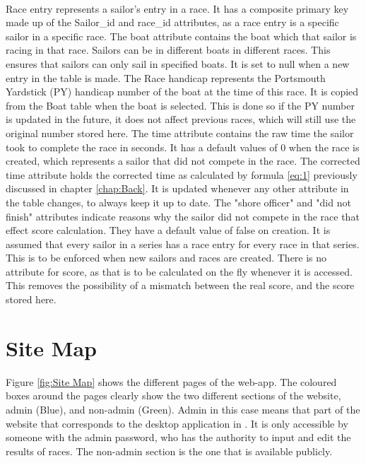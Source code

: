\documentclass{l4proj}
\begin{document}
\begin{outline}
    \hfill\\
    \1
    Race entry represents a sailor's entry in a race. It has a composite primary key made up of the Sailor\_id and race\_id attributes, as a race entry is a specific sailor in a specific race.
        \2
        The boat attribute contains the boat which that sailor is racing in that race. Sailors can be in different boats in different races. This ensures that sailors can only sail in specified boats. It is set to null when a new entry in the table is made.
        \2
        The Race handicap represents the Portsmouth Yardstick (PY) handicap number of the boat at the time of this race. It is copied from the Boat table when the boat is selected. This is done so if the PY number is updated in the future, it does not affect previous races, which will still use the original number stored here.
        \2
        The time attribute contains the raw time the sailor took to complete the race in seconds. It has a default values of 0 when the race is created, which represents a sailor that did not compete in the race.
        \2
        The corrected time attribute holds the corrected time as calculated by formula \ref{eq:1} previously discussed in chapter \ref{chap:Back}. It is updated whenever any other attribute in the table changes, to always keep it up to date.
        \2
        The "shore officer" and "did not finish" attributes indicate reasons why the sailor did not compete in the race that effect score calculation. They have a default value of false on creation.
        \2
        It is assumed that every sailor in a series has a race entry for every race in that series. This is to be enforced when new sailors and races are created. There is no attribute for score, as that is to be calculated on the fly whenever it is accessed. This removes the possibility of a mismatch between the real score, and the score stored here.
\end{outline}

\section{Site Map}

Figure \ref{fig:Site Map} shows the different pages of the web-app. The coloured boxes around the pages clearly show the two different sections of the website, admin (Blue), and non-admin (Green). Admin in this case means that part of the website that corresponds to the desktop application in \citet{sailwave}. It is only accessible by someone with the admin password, who has the authority to input and edit the results of races. The non-admin section is the one that is available publicly.
\end{document}
